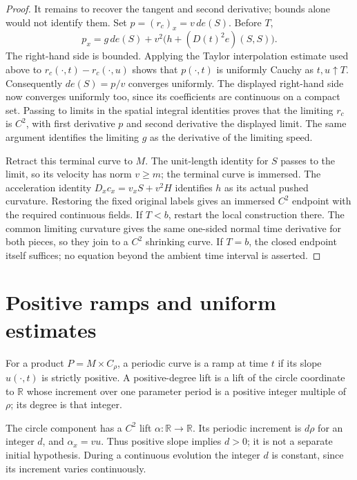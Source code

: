\begin{proof}
It remains to recover the tangent and second derivative; bounds
alone would not identify them.  Set $p=(r_c)_x=v\,de(S)$.
Before $T$,
\[
 p_x=g\,de(S)+v^2\bigl(h+(D(t)^2e)(S,S)\bigr).
\]
The right-hand side is bounded.  Applying the Taylor interpolation
estimate used above to $r_c(\cdot,t)-r_c(\cdot,u)$ shows that
$p(\cdot,t)$ is uniformly Cauchy as $t,u\uparrow T$.
Consequently $de(S)=p/v$ converges uniformly.  The displayed
right-hand side now converges uniformly too, since its coefficients
are continuous on a compact set.  Passing to limits in the
spatial integral identities proves that the limiting $r_c$ is
$C^2$, with first derivative $p$ and second derivative the
displayed limit.  The same argument identifies the limiting $g$
as the derivative of the limiting speed.

Retract this terminal curve to $M$.  The unit-length identity
for $S$ passes to the limit, so its velocity has norm $v\geq m$;
the terminal curve is immersed.  The acceleration identity
$D_xc_x=v_xS+v^2H$ identifies $h$ as its actual pushed curvature.
Restoring the fixed original labels gives an immersed $C^2$
endpoint with the required continuous fields.  If $T<b$, restart
the local construction there.  The common limiting curvature
gives the same one-sided normal time derivative for both pieces,
so they join to a $C^2$ shrinking curve.  If $T=b$, the closed
endpoint itself suffices; no equation beyond the ambient time
interval is asserted.
\end{proof}

\section{Positive ramps and uniform estimates}
\label{sec:ramps-positive}

\begin{definition}[Ramp]
\label{def:ramps-ramp}
For a product $P=M\times C_\rho$, a periodic curve is a ramp at time $t$ if
its slope $u(\cdot,t)$ is strictly positive.  A positive-degree lift is a lift
of the circle coordinate to $\mathbb R$ whose increment over one parameter
period is a positive integer multiple of $\rho$; its degree is that integer.
\end{definition}

The circle component has a $C^2$ lift $\alpha:\mathbb R\to\mathbb R$.
Its periodic increment is $d\rho$ for an integer $d$, and
$\alpha_x=vu$.  Thus positive slope implies $d>0$; it is not a separate
initial hypothesis.  During a continuous evolution the integer $d$ is
constant, since its increment varies continuously.


